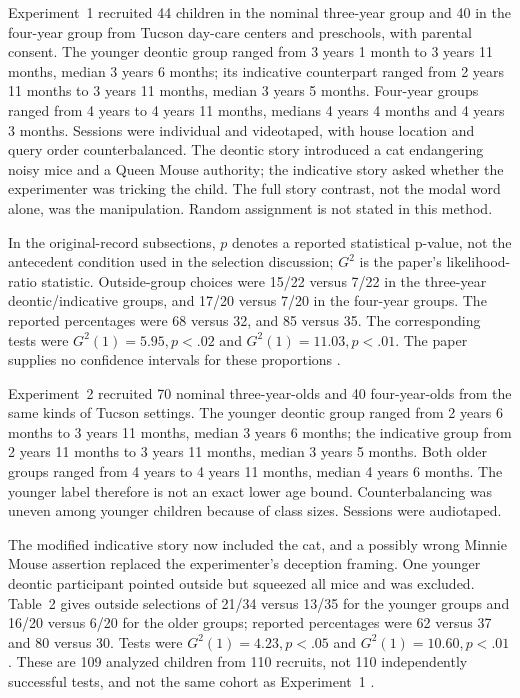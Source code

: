 Experiment~1 recruited 44 children in the nominal three-year group and 40 in
the four-year group from Tucson day-care centers and preschools, with parental
consent. The younger deontic group ranged from 3 years 1 month to 3 years
11 months, median 3 years 6 months; its indicative counterpart ranged from
2 years 11 months to 3 years 11 months, median 3 years 5 months. Four-year
groups ranged from 4 years to 4 years 11 months, medians 4 years 4 months
and 4 years 3 months. Sessions were individual and videotaped, with house
location and query order counterbalanced. The deontic story introduced a cat
endangering noisy mice and a Queen Mouse authority; the indicative story asked
whether the experimenter was tricking the child. The full story contrast,
not the modal word alone, was the manipulation. Random assignment is not
stated in this method.

In the original-record subsections, \(p\) denotes a reported statistical
p-value, not the antecedent condition used in the selection discussion;
\(G^2\) is the paper's likelihood-ratio statistic. Outside-group choices
were 15/22 versus 7/22 in the three-year deontic/indicative groups,
and 17/20 versus 7/20 in the four-year groups. The reported percentages
were 68 versus 32, and 85 versus 35. The corresponding tests were
\(G^2(1)=5.95,p<.02\) and \(G^2(1)=11.03,p<.01\).
The paper supplies no confidence intervals for these proportions
\cite[pp.~824--825, table~1]{Cummins1996PreschoolDeontic}.

Experiment~2 recruited 70 nominal three-year-olds and 40 four-year-olds
from the same kinds of Tucson settings. The younger deontic group ranged
from 2 years 6 months to 3 years 11 months, median 3 years 6 months;
the indicative group from 2 years 11 months to 3 years 11 months, median
3 years 5 months. Both older groups ranged from 4 years to 4 years
11 months, median 4 years 6 months. The younger label therefore is not an
exact lower age bound. Counterbalancing was uneven among younger children
because of class sizes. Sessions were audiotaped.

The modified indicative story now included the cat, and a possibly wrong
Minnie Mouse assertion replaced the experimenter's deception framing.
One younger deontic participant pointed outside but squeezed all mice and
was excluded. Table~2 gives outside selections of 21/34 versus 13/35 for
the younger groups and 16/20 versus 6/20 for the older groups; reported
percentages were 62 versus 37 and 80 versus 30. Tests were
\(G^2(1)=4.23,p<.05\) and \(G^2(1)=10.60,p<.01\).
These are 109 analyzed children from 110 recruits, not 110 independently
successful tests, and not the same cohort as Experiment~1
\cite[p.~826, table~2]{Cummins1996PreschoolDeontic}.

